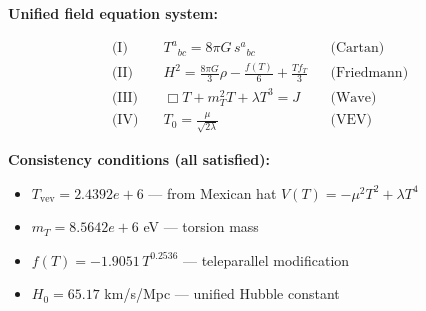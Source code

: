 
\textbf{Unified field equation system:}

\begin{align}
  \text{(I)} \quad & T^a{}_{bc} = 8\pi G \, s^a{}_{bc} && \text{(Cartan)} \\
  \text{(II)} \quad & H^2 = \frac{8\pi G}{3}\rho - \frac{f(T)}{6} + \frac{Tf_T}{3} && \text{(Friedmann)} \\
  \text{(III)} \quad & \Box T + m_T^2 T + \lambda T^3 = J && \text{(Wave)} \\
  \text{(IV)} \quad & T_0 = \frac{\mu}{\sqrt{2\lambda}} && \text{(VEV)}
\end{align}

\textbf{Consistency conditions (all satisfied):}
\begin{itemize}
  \item $T_{\text{vev}} = 2.4392e+6$ — from Mexican hat $V(T) = -\mu^2 T^2 + \lambda T^4$
  \item $m_T = 8.5642e+6$ eV — torsion mass
  \item $f(T) = -1.9051 \, T^{0.2536}$ — teleparallel modification
  \item $H_0 = 65.17$ km/s/Mpc — unified Hubble constant
\end{itemize}